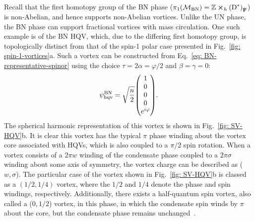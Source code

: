 Recall that the first homotopy group of the BN phase
(\(\pi_1(\mathcal{M}_\text{BN})=\mathbb{Z} \cross_h
{(\text{D}^*)}_{\hat{\vb{F}}}\)) is non-Abelian, and hence supports non-Abelian
vortices.
Unlike the UN phase, the BN phase can support fractional vortices with mass
circulation.
One such example is of the BN HQV, which, due to the differing first homotopy
group, is topologically distinct from that of the spin-1 polar case
presented in Fig.~\ref{fig: spin-1-vortices}a.
Such a vortex can be constructed from Eq.~\eqref{eq: BN-representative-spinor}
using the choice \(\tau=2\alpha=\varphi/2\) and \(\beta=\gamma=0\):
\begin{equation}
    \psi^\text{BN}_\text{hqv} = \sqrt{\frac{n}{2}}\mqty(
    1 \\
    0 \\
    0 \\
    0 \\
    e^{i\varphi}
    ).
\end{equation}
The spherical harmonic representation of this vortex is shown in
Fig.~\ref{fig: SV-HQV}b.
It is clear this vortex has the typical \(\pi \) phase winding about the vortex
core associated with HQVs, which is also coupled to a \(\pi / 2\) spin rotation.
When a vortex consists of a \(2\pi w\) winding of the condensate phase coupled
to a \(2\pi \sigma\) winding about some axis of symmetry, the vortex charge can
be described as (\(w, \sigma\)).
The particular case of the vortex shown in Fig.~\ref{fig: SV-HQV}b is classed as
a \((1/2, 1/4)\) vortex, where the \(1/2\) and \(1/4\) denote the phase and spin
windings, respectively.
Additionally, there exists a half-quantum spin vortex, also called a
(\(0, 1/2\)) vortex, in this phase, in which the condensate spin winds by
\(\pi \) about the core, but the condensate phase remains
unchanged~\cite{Kawaguchi2012}.

